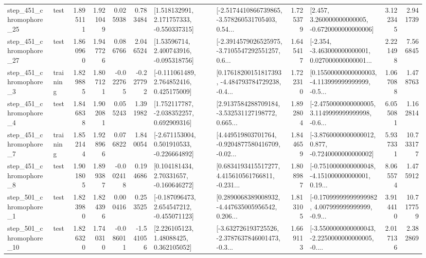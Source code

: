 \begin{tabular}{llrrrrllrlrr}
  step\_451\_chromophore\_25 &      test &      1.895111 &    1.921049 &      0.025938 &  0.783484 &    [1.518132991, 2.171757333, -0.550337315] &  [-2.5174410866739865, -3.578260531705403, 0.54... &       1.725379 &    [2.457, 3.260000000000005, -0.6720000000000006] &            3.122345 &          2.941739 \\
  step\_451\_chromophore\_27 &      test &      1.860960 &    1.947726 &      0.086766 &  2.046524 &     [1.53596714, 2.400743916, -0.095318756] &  [-2.3914579026525975, -3.7105547292551257, 0.6... &       1.645417 &  [-2.354, -3.463000000000001, 0.027000000000001... &            2.221498 &          7.566845 \\
   step\_451\_chromophore\_3 &  training &      1.829885 &    1.807121 &     -0.022765 & -0.227792 &    [-0.111061489, 2.764852416, 0.425175009] &  [0.17618200151817393, -4.484793784729238, -0.4... &       1.722310 &  [0.15500000000000003, -4.113999999999999, -0.5... &            1.067088 &          1.478763 \\
   step\_451\_chromophore\_4 &      test &      1.846838 &    1.902081 &      0.055243 &  1.391982 &    [1.752117787, -2.038352257, 0.692909316] &  [2.9137584288709184, -3.532531127198772, 0.665... &       1.892804 &  [-2.4750000000000005, 3.1149999999999998, -0.6... &            6.055081 &          1.162814 \\
   step\_451\_chromophore\_7 &  training &      1.852144 &    1.928966 &      0.076822 &  1.840054 &   [-2.671153004, 0.501910533, -0.226664892] &  [4.449519803701764, -0.9204877580416709, -0.02... &       1.844659 &  [-3.8760000000000012, 0.877, -0.7240000000000002] &            5.937331 &         10.733177 \\
   step\_451\_chromophore\_8 &      test &      1.901805 &    1.899387 &     -0.002418 &  0.194686 &     [0.104181434, 2.70331657, -0.160646272] &  [0.6834193415517277, 4.415610561766811, -0.231... &       1.808987 &  [-0.7510000000000048, -4.151000000000001, 0.19... &            8.065574 &          1.475912 \\
   step\_501\_chromophore\_1 &      test &      1.823980 &    1.824396 &      0.000416 &  0.253525 &   [-0.187096473, 2.654547212, -0.455071123] &  [0.2890068389008932, -4.447635005956542, 0.206... &       1.813105 &  [-0.17099999999999982, 4.007999999999999, -0.9... &            3.914410 &         10.717759 \\
  step\_501\_chromophore\_10 &      test &      1.826320 &    1.740310 &     -0.086011 & -1.541056 &      [2.226105123, 1.48088425, 0.362105052] &  [-3.632726193725526, -2.3787637846001473, -0.3... &       1.669113 &  [-3.5500000000000043, -2.2250000000000005, -0.... &            2.017136 &          2.382869 \\

\end{tabular}
